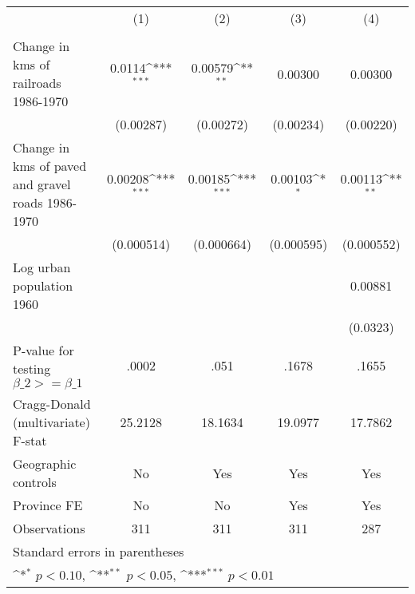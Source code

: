 {
\def\sym#1{\ifmmode^{#1}\else\(^{#1}\)\fi}
\begin{tabular}{l*{4}{c}}
\hline\hline
                &\multicolumn{1}{c}{(1)}&\multicolumn{1}{c}{(2)}&\multicolumn{1}{c}{(3)}&\multicolumn{1}{c}{(4)}\\
                &\multicolumn{1}{c}{}&\multicolumn{1}{c}{}&\multicolumn{1}{c}{}&\multicolumn{1}{c}{}\\
\hline
Change in kms of railroads 1986-1970&   0.0114\sym{***}&  0.00579\sym{**} &  0.00300         &  0.00300         \\
                &(0.00287)         &(0.00272)         &(0.00234)         &(0.00220)         \\
[1em]
Change in kms of paved and gravel roads 1986-1970&  0.00208\sym{***}&  0.00185\sym{***}&  0.00103\sym{*}  &  0.00113\sym{**} \\
                &(0.000514)         &(0.000664)         &(0.000595)         &(0.000552)         \\
[1em]
Log urban population 1960&                  &                  &                  &  0.00881         \\
                &                  &                  &                  & (0.0323)         \\
\hline
P-value for testing $\beta\_{2} >= \beta\_{1}$&    .0002         &     .051         &    .1678         &    .1655         \\
Cragg-Donald (multivariate) F-stat&  25.2128         &  18.1634         &  19.0977         &  17.7862         \\
Geographic controls&       No         &      Yes         &      Yes         &      Yes         \\
Province FE     &       No         &       No         &      Yes         &      Yes         \\
Observations    &      311         &      311         &      311         &      287         \\
\hline\hline
\multicolumn{5}{l}{\footnotesize Standard errors in parentheses}\\
\multicolumn{5}{l}{\footnotesize \sym{*} \(p<0.10\), \sym{**} \(p<0.05\), \sym{***} \(p<0.01\)}\\
\end{tabular}
}
